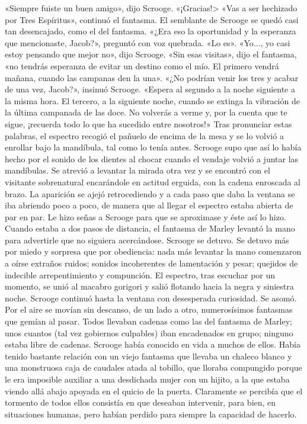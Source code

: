 \documentclass{novela}
\begin{document}
 «Siempre fuiste un buen amigo», dijo Scrooge. «¡Gracias!>
 «Vas a ser hechizado por Tres Espíritus», continuó el fantasma.
 El semblante de Scrooge se quedó casi tan desencajado, como el del fantasma.
 «¿Era eso la oportunidad y la esperanza que mencionaste, Jacob?», preguntó con voz quebrada.
 «Lo es».
 «Yo..., yo casi estoy pensando que mejor no», dijo Scrooge.
 «Sin esas visitas», dijo el fantasma, «no tendrás esperanza de evitar un destino como el mío. El primero vendrá mañana, cuando las campanas den la una».
 «¿No podrían venir los tres y acabar de una vez, Jacob?», insinuó Scrooge.
 «Espera al segundo a la noche siguiente a la misma hora. El tercero, a la siguiente noche, cuando se extinga la vibración de la última campanada de las doce. No volverás a verme y, por la cuenta que te sigue, ¡recuerda todo lo que ha sucedido entre nosotros!»
 Tras pronunciar estas palabras, el espectro recogió el pañuelo de encima de la mesa y se lo volvió a enrollar bajo la mandíbula, tal como lo tenía antes. Scrooge supo que así lo había hecho por el sonido de los dientes al chocar cuando el vendaje volvió a juntar las mandíbulas. Se atrevió a levantar la mirada otra vez y se encontró con el visitante sobrenatural encarándole en actitud erguida, con la cadena enroscada al brazo.
 La aparición se ajejó retrocediendo y a cada paso que daba la ventana se iba abriendo poco a poco, de manera que al llegar el espectro estaba abierta de par en par. Le hizo señas a Scrooge para que se aproximase y éste así lo hizo. Cuando estaba a dos pasos de distancia, el fantasma de Marley levantó la mano para advertirle que no siguiera acercándose. Scrooge se detuvo. Se detuvo más por miedo y sorpresa que por obediencia: nada más levantar la mano comenzaron a oírse extraños ruidos; sonidos incoherentes de lamentación y pesar; quejidos de indecible arrepentimiento y compunción. El espectro, tras escuchar por un momento, se unió al macabro gorigori y salió flotando hacia la negra y siniestra noche.
 Scrooge continuó hasta la ventana con desesperada curiosidad. Se asomó.
 Por el aire se movían sin descanso, de un lado a otro, numerosísimos fantasmas que gemían al pasar. Todos llevaban cadenas como las del fantasma de Marley; unos cuantos (tal vez gobiernos culpables) iban encadenados en grupo; ninguno estaba libre de cadenas. Scrooge había conocido en vida a muchos de ellos. Había tenido bastante relación con un viejo fantasma que llevaba un chaleco blanco y una monstruosa caja de caudales atada al tobillo, que lloraba compungido porque le era imposible auxiliar a una desdichada mujer con un hijito, a la que estaba viendo allá abajo apoyada en el quicio de la puerta. Claramente se percibía que el tormento de todos ellos consistía en que deseaban intervenir, para bien, en situaciones humanas, pero habían perdido para siempre la capacidad de hacerlo.
\end{document}
